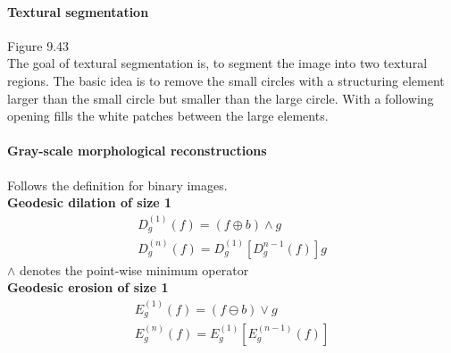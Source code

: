 \paragraph{Textural segmentation}
Figure 9.43\\
The goal of textural segmentation is, to segment the image into two textural regions. The basic idea is to remove the small circles with a structuring element larger than the small circle but smaller than the large circle. With a following opening fills the white patches between the large elements.
\paragraph{Gray-scale morphological reconstructions}
Follows the definition for binary images.\\
\textbf{Geodesic dilation of size 1}
\begin{align*}
	D_g^{(1)}(f) = (f\oplus b)\wedge g\\
	D_g^{(n)}(f) = D_g^{(1)}[D_g^{n-1}(f)] g
\end{align*}
$\wedge$ denotes the point-wise minimum operator\\
\textbf{Geodesic erosion of size 1}
\begin{align*}
	E_g^{(1)}(f) = (f\ominus b)\vee g\\
	E_g^{(n)}(f) = E_g^{(1)}[E_g^{(n-1)}(f)]
\end{align*}
